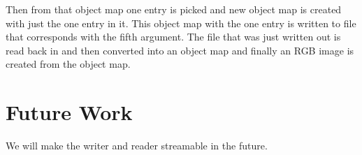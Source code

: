 \documentclass{InsightArticle}
\begin{document}
Then from that object map one entry is picked and new object map is created with just the one entry in it.  This object map with the one entry is written to file that corresponds with the fifth argument.  The file that was just written out is read back in and then converted into an object map and finally an RGB image is created from the object map.

\section{Future Work}

We will make the writer and reader streamable in the future.


%
%



\end{document}
